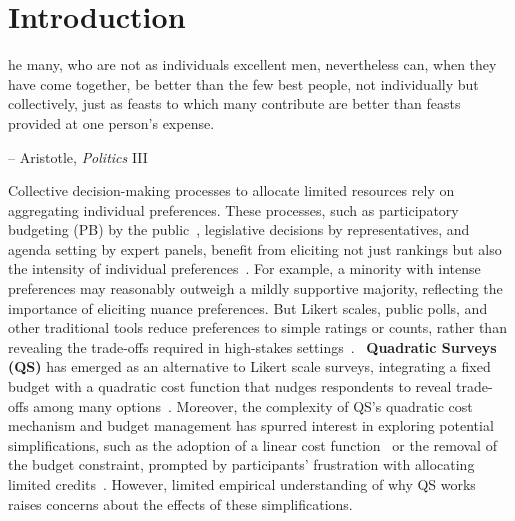 \section{Introduction}

\begin{displayquote}
[T]he many, who are not as individuals excellent men, nevertheless can, when they have come together, be better than the few best people, not individually but collectively, just as feasts to which many contribute are better than feasts provided at one person's expense.

\begin{flushright}
-- Aristotle, \textit{Politics} III
\end{flushright}
\end{displayquote}

Collective decision-making processes to allocate limited resources rely on aggregating individual preferences. These processes, such as participatory budgeting (PB) by the public~\cite{desousasantosParticipatoryBudgetingPorto1998}, legislative decisions by representatives, and agenda setting by expert panels, benefit from eliciting not just rankings but also the intensity of individual preferences~\cite{weylShuWeiPluralityFuture2024, krosnick1999survey}. For example, a minority with intense preferences may reasonably outweigh a mildly supportive majority, reflecting the importance of eliciting nuance preferences. But Likert scales, public polls, and other traditional tools reduce preferences to simple ratings or counts, rather than revealing the trade-offs required in high-stakes settings~\cite{quarfoot2017quadratic,posner2017quadratic, krosnick1999survey}. ~\textbf{Quadratic Surveys (QS)} has emerged as an alternative to Likert scale surveys, integrating a fixed budget with a quadratic cost function that nudges respondents to reveal trade-offs among many options~\cite{chengCanShowWhat2021, quarfoot2017quadratic, cavaille2024cares}. Moreover, the complexity of QS's quadratic cost mechanism and budget management has spurred interest in exploring potential simplifications, such as the adoption of a linear cost function~\cite{cavaille2024cares} or the removal of the budget constraint, prompted by participants' frustration with allocating limited credits~\cite{chengCanShowWhat2021}. However, limited empirical understanding of why QS works raises concerns about the effects of these simplifications.


